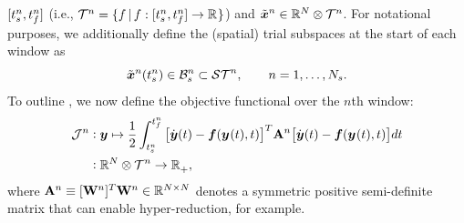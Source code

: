 $[\timeStartArg{n},\timeEndArg{n}]$ (i.e., $\timeSpaceArg{n} = \{f\,|\,f:[\timeStartArg{n},\timeEndArg{n}]\rightarrow\RR{}\}$)
and
$\approxstate^n \in\RR{\fomdim}\otimes\timeSpaceArg{n}$. For notational purposes, we additionally define the (spatial) trial subspaces at the start of each window as
$$\approxstateArg{n}{\timeStartArg{n}} \in \stspaceBoundStartArg{n} \subset \stspaceArg{n}, \qquad n=1,\ldots,\nslabs. 
$$ 
To outline \methodAcronym, we now define the objective functional over the $n$th window:
\begin{equation}\label{eq:obj}
\begin{split} \mathcal{J}^n &\vcentcolon \statey \mapsto
\frac{1}{2} \int_{\timeStartArg{n}}^{\timeEndArg{n}} \big[ \dot{\statey}(t)
- \velocity(\stateyArg{}{t},t) \big]^T \stweightingMatArgt{n}{t} \big[
\dot{\statey}(t) - \velocity(\stateyArg{}{t},t) \big] d t \\
&\vcentcolon \RR{\fomdim}\otimes \timeSpaceArg{n}  \rightarrow
\RR{}_+, 
\end{split}
\end{equation}
where $\stweightingMatArg{n} \equiv \stweightingMatOneTArg{n}
\stweightingMatOneArg{n} \in \RR{\fomdim \times \fomdim}$ denotes a
symmetric positive semi-definite matrix that can enable hyper-reduction, for
example. 

